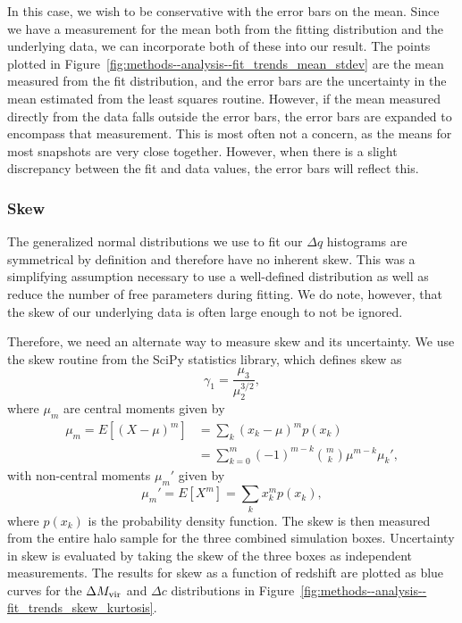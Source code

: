 In this case, we wish to be conservative with the error bars on the mean.  Since we have a measurement for the mean both from the fitting distribution and the underlying data, we can incorporate both of these into our result.  The points plotted in Figure~\ref{fig:methods--analysis--fit_trends_mean_stdev} are the mean measured from the fit distribution, and the error bars are the uncertainty in the mean estimated from the least squares routine.  However, if the mean measured directly from the data falls outside the error bars, the error bars are expanded to encompass that measurement.  This is most often not a concern, as the means for most snapshots are very close together.  However, when there is a slight discrepancy between the fit and data values, the error bars will reflect this.



\subsubsection{Skew}
\label{subsubsec:analysis--redshift_trends--skew}


The generalized normal distributions we use to fit our $\Delta q$ histograms are symmetrical by definition and therefore have no inherent skew.  This was a simplifying assumption necessary to use a well-defined distribution as well as reduce the number of free parameters during fitting.  We do note, however, that the skew of our underlying data is often large enough to not be ignored.

Therefore, we need an alternate way to measure skew and its uncertainty.  We use the skew routine from the SciPy statistics library, which defines skew as
\begin{equation} \label{eq:analysis--skew_def}
	\gamma_{1} = \frac{ \mu_{3} }{ \mu_{2}^{3/2} },
\end{equation}
where $\mu_{m}$ are central moments given by
\begin{align} \label{eq:analysis--central_moments}
	\mu_{m} = E[(X - \mu)^{m}] &= \sum_{k} (x_{k} - \mu)^{m} p(x_{k}) \\
	                           &= \sum_{k=0}^{m} (-1)^{m - k} \binom{m}{k} \mu^{m - k} \mu_{k}',
\end{align}
with non-central moments $\mu_{m}'$ given by
\begin{equation} \label{eq:analysis--non-central_moments}
	\mu_{m}' = E[X^{m}] = \sum_{k} x_{k}^{m} p(x_{k}),
\end{equation}
where $p(x_{k})$ is the probability density function.  The skew is then measured from the entire halo sample for the three combined simulation boxes.  Uncertainty in skew is evaluated by taking the skew of the three boxes as independent measurements.  The results for skew as a function of redshift are plotted as blue curves for the $\Delta {M_{\mathrm{vir}}}$ and $\Delta c$ distributions in Figure~\ref{fig:methods--analysis--fit_trends_skew_kurtosis}.


